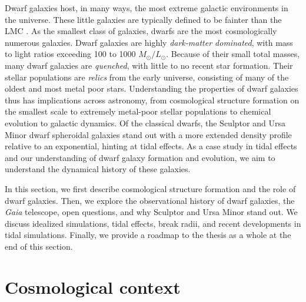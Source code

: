 Dwarf galaxies host, in many ways, the most extreme galactic
environments in the universe. These little galaxies are typically
defined to be fainter than the LMC \citep[\(M_V \gtrsim -18\) or
similarly \(L \lesssim 10^9 L_\odot\),
e.g.,][]{hodge1971, mcconnachie2012}. As the smallest class of galaxies,
dwarfs are the most cosmologically numerous galaxies. Dwarf galaxies are
highly \emph{dark-matter dominated}, with mass to light ratios exceeding
100 to 1000 \(M_\odot/ L_\odot\). Because of their small total masses,
many dwarf galaxies are \emph{quenched}, with little to no recent star
formation. Their stellar populations are \emph{relics} from the early
universe, consisting of many of the oldest and most metal poor stars.
Understanding the properties of dwarf galaxies thus has implications
across astronomy, from cosmological structure formation on the smallest
scale to extremely metal-poor stellar populations to chemical evolution
to galactic dynamics. Of the classical dwarfs, the Sculptor and Ursa
Minor dwarf spheroidal galaxies stand out with a more extended density
profile relative to an exponential, hinting at tidal effects. As a case
study in tidal effects and our understanding of dwarf galaxy formation
and evolution, we aim to understand the dynamical history of these
galaxies.

In this section, we first describe cosmological structure formation and
the role of dwarf galaxies. Then, we explore the observational history
of dwarf galaxies, the \emph{Gaia} telescope, open questions, and why
Sculptor and Ursa Minor stand out. We discuss idealized simulations,
tidal effects, break radii, and recent developments in tidal
simulations. Finally, we provide a roadmap to the thesis as a whole at
the end of this section.

\section{Cosmological context}\label{cosmological-context}

